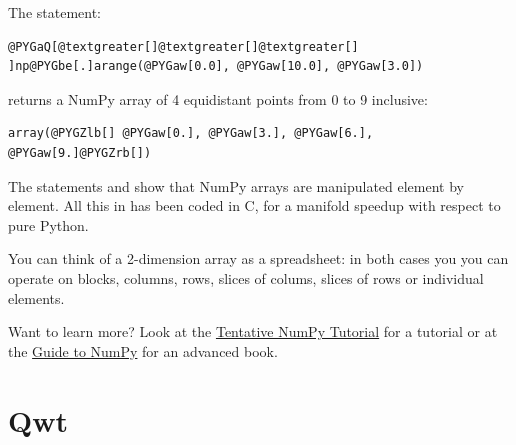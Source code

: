 \documentclass[a4paper,10pt,english]{manual}
\begin{document}
The statement:

\begin{Verbatim}[commandchars=@\[\]]
@PYGaQ[@textgreater[]@textgreater[]@textgreater[] ]np@PYGbe[.]arange(@PYGaw[0.0], @PYGaw[10.0], @PYGaw[3.0])
\end{Verbatim}

returns a NumPy array of 4 equidistant points from 0 to 9 inclusive:

\begin{Verbatim}[commandchars=@\[\]]
array(@PYGZlb[] @PYGaw[0.], @PYGaw[3.], @PYGaw[6.], @PYGaw[9.]@PYGZrb[])
\end{Verbatim}

The statements  and  show that NumPy
arrays are manipulated element by element.
All this in has been coded in C, for a manifold speedup with respect
to pure Python.

You can think of a 2-dimension array as a spreadsheet: in both cases
you you can operate on blocks, columns, rows, slices of colums, slices
of rows or individual elements.

Want to learn more?
Look at the
\href{http://www.scipy.org/Tentative\_NumPy\_Tutorial}{Tentative NumPy Tutorial}
for a tutorial or at the
\href{http://www.tramy.us/numpybook.pdf}{Guide to NumPy}
for an advanced book.


\section{Qwt}
\end{document}
